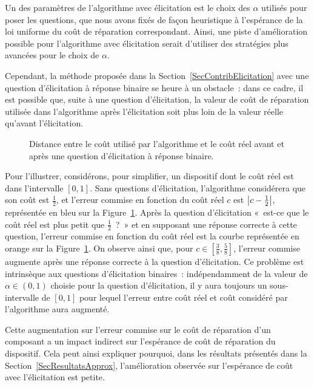 \documentclass[a4paper,11pt]{article}
\theoremstyle{plain}
\theoremstyle{definition}
\DeclarePairedDelimiter{\abs}{\lvert}{\rvert}
\begin{document}
Un des paramètres de l'algorithme avec élicitation est le choix des $\alpha$ utilisés pour poser les questions, que nous avons fixés de façon heuristique à l'espérance de la loi uniforme du coût de réparation correspondant. Ainsi, une piste d'amélioration possible pour l'algorithme avec élicitation serait d'utiliser des stratégies plus avancées pour le choix de $\alpha$.

Cependant, la méthode proposée dans la Section~\ref{SecContribElicitation} avec une question d'élicitation à réponse binaire se heure à un obstacle~: dans ce cadre, il est possible que, suite à une question d'élicitation, la valeur de coût de réparation utilisée dans l'algorithme après l'élicitation soit plus loin de la valeur réelle qu'avant l'élicitation.

\begin{figure}[ht]
\centering
\resizebox{0.5\textwidth}{!}{}
\caption{Distance entre le coût utilisé par l'algorithme et le coût réel avant et après une question d'élicitation à réponse binaire.}
\label{FigElicitationBinaire}
\end{figure}

Pour l'illustrer, considérons, pour simplifier, un dispositif dont le coût réel est dans l'intervalle $[0, 1]$. Sans questions d'élicitation, l'algorithme considérera que son coût est $\frac{1}{2}$, et l'erreur commise en fonction du coût réel $c$ est $\abs*{c - \frac{1}{2}}$, représentée en bleu sur la Figure~\ref{FigElicitationBinaire}. Après la question d'élicitation «~est-ce que le coût réel est plus petit que $\frac{1}{2}$~?~» et en supposant une réponse correcte à cette question, l'erreur commise en fonction du coût réel est la courbe représentée en orange sur la Figure~\ref{FigElicitationBinaire}. On observe ainsi que, pour $c \in \left[\frac{3}{8}, \frac{5}{8}\right]$, l'erreur commise augmente après une réponse correcte à la question d'élicitation. Ce problème est intrinsèque aux questions d'élicitation binaires~: indépendamment de la valeur de $\alpha \in (0, 1)$ choisie pour la question d'élicitation, il y aura toujours un sous-intervalle de $[0, 1]$ pour lequel l'erreur entre coût réel et coût considéré par l'algorithme aura augmenté.

Cette augmentation sur l'erreur commise sur le coût de réparation d'un composant a un impact indirect sur l'espérance de coût de réparation du dispositif. Cela peut ainsi expliquer pourquoi, dans les résultats présentés dans la Section~\ref{SecResultatsApprox}, l'amélioration observée sur l'espérance de coût avec l'élicitation est petite.
\end{document}
